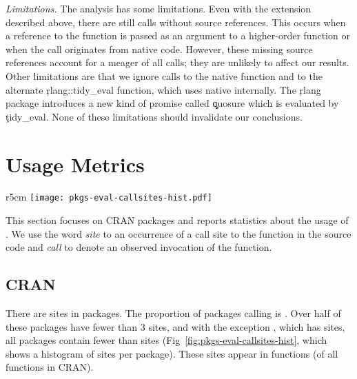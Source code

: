 \documentclass[review,screen,acmsmall,anonymous=true]{acmart}
\newcommand{\mypara}[1]{\medskip\noindent\emph{#1}\xspace}
\begin{document}
\mypara{Limitations.} The analysis has some limitations. Even with the extension
described above, there are still \PkgUndefinedRnd \eval calls without source
references. This occurs when a reference to the \eval function is passed as an 
argument to a higher-order function or when the \eval call originates from
native code. However, these missing source references account for a meager
\PkgUndefinedRatio of all calls; they are unlikely to affect our results. Other
limitations are that we ignore calls to the native \eval function and to the
alternate \c{rlang::tidy\_eval} function, which uses native \eval internally.
The \c{rlang} package introduces a new kind of promise called \c{quosure} which
is evaluated by \c{tidy\_eval}. None of these limitations should invalidate our
conclusions.

\section{Usage Metrics}

\begin{wrapfigure}{r}{5cm} \hspace*{-12mm}
  \centering
  \texttt{[image: pkgs-eval-callsites-hist.pdf]} \caption{CRAN
  \eval call sites}%
  \label{fig:pkgs-eval-callsites-hist}
\end{wrapfigure}
%
This section focuses on CRAN packages and reports statistics about the usage of
\eval. We use the word \emph{site} to an occurrence of a call site to the \eval
function in the source code and \emph{call} to denote an observed invocation of
the \eval function.

\subsection{CRAN}

There are \PkgEvalCallSites \eval sites in \PkgPackages packages. The proportion
of packages calling \eval is \PkgPackagesRatio. Over half of these packages
have fewer than 3 sites, and with the exception \MaxEvalCallSitesPackage, which
has \MaxEvalCallSitesCount sites, all packages contain fewer than
\MaxEvalCallSitesRest sites (\cf Fig~\ref{fig:pkgs-eval-callsites-hist}, which
shows a histogram of sites per package). These sites appear in \PkgFunsWithEval
functions (\CranFunsWithEvalRatio of all functions in CRAN).
\end{document}
